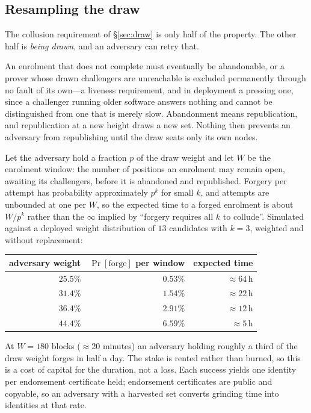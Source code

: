 \documentclass[conference,10pt]{IEEEtran}
\begin{document}
\subsection{Resampling the draw}
\label{sec:resample}

The collusion requirement of \S\ref{sec:draw} is only half of the property. The other half is
\emph{being drawn}, and an adversary can retry that.

An enrolment that does not complete must eventually be abandonable, or a prover whose drawn challengers
are unreachable is excluded permanently through no fault of its own---a liveness requirement, and in
deployment a pressing one, since a challenger running older software answers nothing and cannot be
distinguished from one that is merely slow. Abandonment means republication, and republication at a new
height draws a new set. Nothing then prevents an adversary from republishing until the draw seats only
its own nodes.

Let the adversary hold a fraction $p$ of the draw weight and let $W$ be the enrolment window: the number of positions an enrolment may remain open, awaiting its challengers, before it is abandoned and republished. Forgery per
attempt has probability approximately $p^k$ for small $k$, and attempts are unbounded at one per $W$, so
the expected time to a forged enrolment is about $W/p^k$ rather than the $\infty$ implied by
``forgery requires all $k$ to collude''. Simulated against a deployed weight distribution of $13$
candidates with $k=3$, weighted and without replacement:

\begin{center}
\begin{tabular}{rrr}
\hline
adversary weight & $\Pr[\text{forge}]$ per window & expected time \\
\hline
$25.5\%$ & $0.53\%$ & ${\approx}64$\,h \\
$31.4\%$ & $1.54\%$ & ${\approx}22$\,h \\
$36.4\%$ & $2.91\%$ & ${\approx}12$\,h \\
$44.4\%$ & $6.59\%$ & ${\approx}5$\,h \\
\hline
\end{tabular}
\end{center}

At $W=180$ blocks ($\approx$20 minutes) an adversary holding roughly a third of the draw weight forges in
half a day. The stake is rented rather than burned, so this is a cost of capital for the duration, not a
loss. Each success yields one identity per endorsement certificate held; endorsement certificates are
public and copyable, so an adversary with a harvested set converts grinding time into identities at that
rate.
\end{document}
